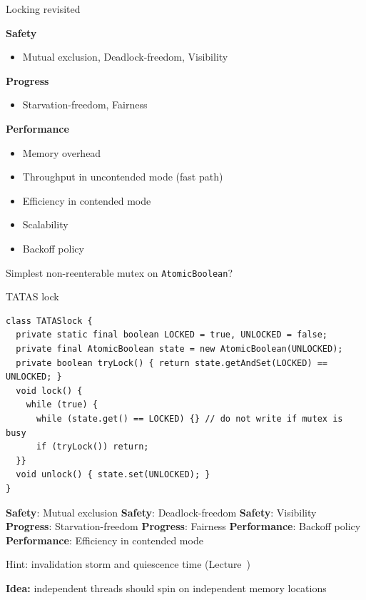 

\begin{frame}[t,noframenumbering]{Locking revisited}

\textbf{Safety}
\begin{itemize}
  \item Mutual exclusion, Deadlock-freedom, Visibility
\end{itemize}

\textbf{Progress}
\begin{itemize}
  \item Starvation-freedom, Fairness  
\end{itemize}

\textbf{Performance}
\begin{itemize}
  \item Memory overhead   
  \item Throughput in uncontended mode (fast path)
  \item Efficiency in contended mode     
  \item Scalability
  \item Backoff policy  
\end{itemize}

\pause

Simplest non-reenterable mutex on \texttt{AtomicBoolean}?
\end{frame}


\begin{frame}[t,fragile]{TATAS lock}

\begin{verbatim}
class TATASlock {
  private static final boolean LOCKED = true, UNLOCKED = false;
  private final AtomicBoolean state = new AtomicBoolean(UNLOCKED);
  private boolean tryLock() { return state.getAndSet(LOCKED) == UNLOCKED; }
  void lock() {
    while (true) {
      while (state.get() == LOCKED) {} // do not write if mutex is busy 
      if (tryLock()) return;
  }}
  void unlock() { state.set(UNLOCKED); }
}
\end{verbatim}

 {\textbf{Safety}: Mutual exclusion}
 {\textbf{Safety}: Deadlock-freedom}
 {\textbf{Safety}: Visibility}
 {\textbf{Progress}: Starvation-freedom}
 {\textbf{Progress}: Fairness}
 {\textbf{Performance}: Backoff policy}
 {\textbf{Performance}: Efficiency in contended mode}
 {

Hint: invalidation storm and quiescence time (Lecture~\atomicsNum)
}

 {\textbf{Idea:} independent threads should spin on independent memory locations}

\end{frame}

